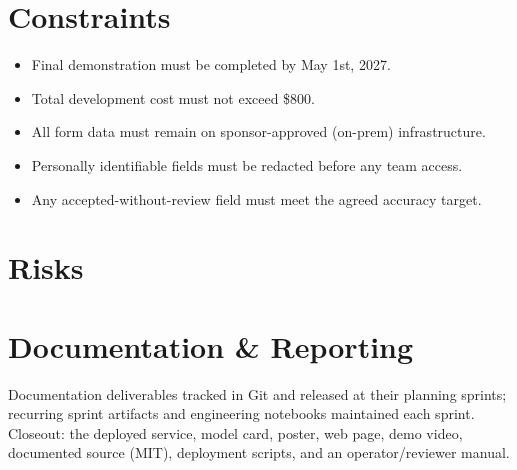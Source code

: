 \documentclass[11pt,letterpaper]{article}
\begin{document}
\section{Constraints}
\begin{itemize}
  \item Final demonstration must be completed by May 1st, 2027.
  \item Total development cost must not exceed \$800.
  \item All form data must remain on sponsor-approved (on-prem) infrastructure.
  \item Personally identifiable fields must be redacted before any team access.
  \item Any accepted-without-review field must meet the agreed accuracy target.
\end{itemize}

\section{Risks}
\begin{table}[h]
\caption{Highest-exposure project risks}
\end{table}

\section{Documentation \& Reporting}
Documentation deliverables tracked in Git and released at their planning sprints;
recurring sprint artifacts and engineering notebooks maintained each sprint.
Closeout: the deployed service, model card, poster, web page, demo video, documented
source (MIT), deployment scripts, and an operator/reviewer manual.


{}
\end{document}
